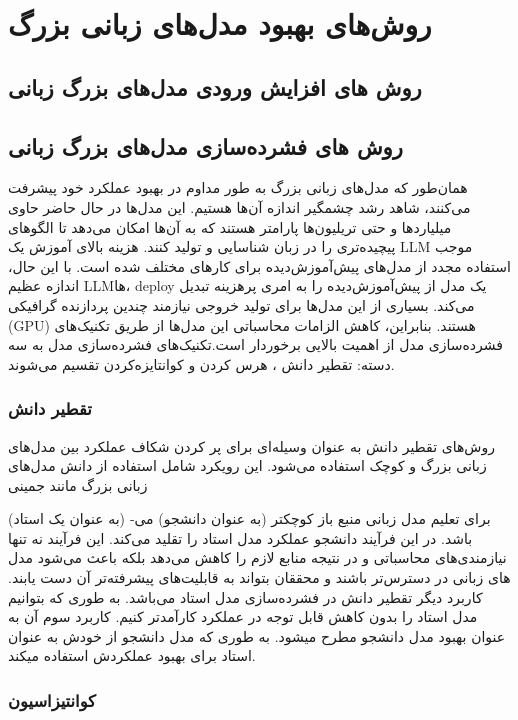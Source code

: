 
\section{روش‌های بهبود مدل‌های زبانی بزرگ}
\subsection{روش های افزایش ورودی مدل‌های بزرگ زبانی}

\subsection{روش های فشرده‌سازی مدل‌های بزرگ زبانی}
همان‌طور که مدل‌های زبانی بزرگ به طور مداوم در بهبود عملکرد خود پیشرفت می‌کنند، شاهد رشد چشمگیر اندازه آن‌ها هستیم. این مدل‌ها در حال حاضر حاوی میلیاردها و حتی تریلیون‌ها پارامتر هستند که به آن‌ها امکان می‌دهد تا الگوهای پیچیده‌تری را در زبان شناسایی و تولید کنند. هزینه بالای آموزش یک LLM موجب  استفاده مجدد از مدل‌های پیش‌آموزش‌دیده برای کارهای مختلف شده است. با این حال، اندازه عظیم LLMها، deploy یک مدل از پیش‌آموزش‌دیده را به امری پرهزینه تبدیل می‌کند. بسیاری از این مدل‌ها برای  تولید خروجی نیازمند چندین پردازنده گرافیکی (GPU) هستند. بنابراین، کاهش الزامات محاسباتی این مدل‌ها از طریق تکنیک‌های فشرده‌سازی مدل از اهمیت بالایی برخوردار است.تکنیک‌های فشرده‌سازی مدل به سه دسته: تقطیر دانش 
، هرس کردن 
و کوانتایزه‌کردن
تقسیم می‌شوند.
\subsubsection{تقطیر دانش}
روش‌­های تقطیر دانش به عنوان وسیله‌­ای برای پر کردن شکاف عملکرد بین مدل­‌های زبانی بزرگ و کوچک استفاده می‌شود. این رویکرد شامل استفاده از دانش مدل‌های زبانی بزرگ مانند جمینی

(به عنوان یک استاد) برای تعلیم مدل زبانی منبع باز کوچک­تر (به عنوان دانشجو) می‌­باشد. در این فرآیند دانشجو عملکرد مدل استاد را تقلید می‌­کند. این فرآیند نه تنها نیازمندی‌های محاسباتی و در نتیجه منابع لازم را کاهش می­‌دهد بلکه باعث می‌­شود مدل­‌های زبانی در دسترس‌­تر باشند و محققان بتواند به قابلیت‌­های پیشرفته­‌تر آن دست یابند. کاربرد دیگر تقطیر دانش در فشرده‌­سازی مدل استاد می‌­باشد. به طوری که بتوانیم مدل استاد را بدون کاهش قابل توجه در عملکرد کارآمدتر کنیم. کاربرد سوم آن به عنوان بهبود مدل دانشجو مطرح می­شود.  به طوری که مدل دانشجو از خودش به عنوان استاد برای بهبود عملکردش استفاده می­کند.
\subsubsection{کوانتیزاسیون }


